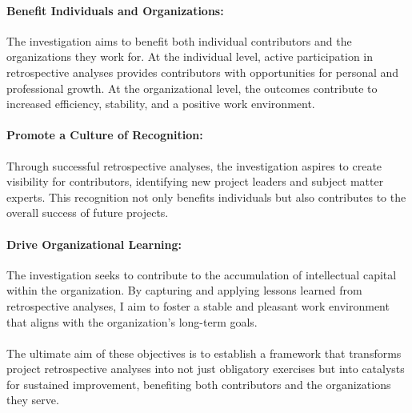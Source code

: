 \documentclass{article}
\begin{document}
\paragraph*{Benefit Individuals and Organizations:} The investigation aims to benefit both individual contributors and the organizations they work for. At the individual level, active participation in retrospective analyses provides contributors with opportunities for personal and professional growth. At the organizational level, the outcomes contribute to increased efficiency, stability, and a positive work environment.

\paragraph*{Promote a Culture of Recognition:} Through successful retrospective analyses, the investigation aspires to create visibility for contributors, identifying new project leaders and subject matter experts. This recognition not only benefits individuals but also contributes to the overall success of future projects.

\paragraph*{Drive Organizational Learning:} The investigation seeks to contribute to the accumulation of intellectual capital within the organization. By capturing and applying lessons learned from retrospective analyses, I aim to foster a stable and pleasant work environment that aligns with the organization's long-term goals.
\\
\\The ultimate aim of these objectives is to establish a framework that transforms project retrospective analyses into not just obligatory exercises but into catalysts for sustained improvement, benefiting both contributors and the organizations they serve.
\end{document}
